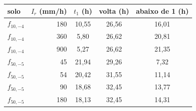 \begin{tabular}{lr|ccc}
\toprule
solo & $I_r$ (mm/h) & $t_1$ (h) & volta (h) & abaixo de 1 (h)\\
\midrule
$f_{10,-4}$ & 180 & 10{,}55 & 26{,}56 & 16{,}01\\
$f_{10,-4}$ & 360 & 5{,}80 & 26{,}62 & 20{,}81\\
$f_{10,-4}$ & 900 & 5{,}27 & 26{,}62 & 21{,}35\\
$f_{50,-5}$ & 45 & 21{,}94 & 29{,}26 & 7{,}32\\
$f_{50,-5}$ & 54 & 20{,}42 & 31{,}55 & 11{,}14\\
$f_{50,-5}$ & 90 & 18{,}68 & 32{,}45 & 13{,}77\\
$f_{50,-5}$ & 180 & 18{,}13 & 32{,}45 & 14{,}31\\
\bottomrule
\end{tabular}
